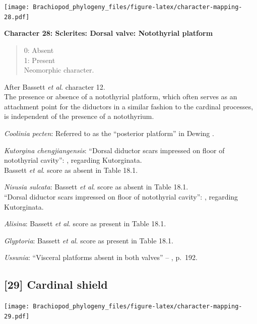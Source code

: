 \documentclass[openany]{book}
\theoremstyle{definition}
\theoremstyle{definition}
\theoremstyle{definition}
\theoremstyle{remark}
\begin{document}
\texttt{[image: Brachiopod\_phylogeny\_files/figure-latex/character-mapping-28.pdf]}

\textbf{Character 28: Sclerites: Dorsal valve: Notothyrial platform}

\begin{quote}
0: Absent\\
1: Present\\
Neomorphic character.
\end{quote}

After Bassett \emph{et al}.
\citeyearpar{Bassett2001Functionalmorphology} character 12.\\
The presence or absence of a notothyrial platform, which often serves as
an attachment point for the diductors in a similar fashion to the
cardinal processes, is independent of the presence of a notothyrium.

\emph{Coolinia pecten}: Referred to as the ``posterior platform'' in
Dewing \citeyearpar{Dewing2001Hingemodifications}.

\emph{Kutorgina chengjiangensis}: ``Dorsal diductor scars impressed on
floor of notothyrial cavity'':
\citet{Williams2000BrachiopodaLinguliformea}, regarding Kutorginata.\\
Bassett \emph{et al}. \citeyearpar{Bassett2001Functionalmorphology}
score as absent in Table 18.1.

\emph{Nisusia sulcata}: Bassett \emph{et al}.
\citeyearpar{Bassett2001Functionalmorphology} score as absent in Table
18.1.\\
``Dorsal diductor scars impressed on floor of notothyrial cavity'':
\citet{Williams2000BrachiopodaLinguliformea}, regarding Kutorginata.

\emph{Alisina}: Bassett \emph{et al}.
\citeyearpar{Bassett2001Functionalmorphology} score as present in Table
18.1.

\emph{Glyptoria}: Bassett \emph{et al}.
\citeyearpar{Bassett2001Functionalmorphology} score as present in Table
18.1.

\emph{Ussunia}: ``Visceral platforms absent in both valves'' --
\citet{Williams2000BrachiopodaLinguliformea}, p.~192.

\hypertarget{cardinal-shield}{%
\subsection*{{[}29{]} Cardinal shield}\label{cardinal-shield}}

\texttt{[image: Brachiopod\_phylogeny\_files/figure-latex/character-mapping-29.pdf]}
\end{document}

